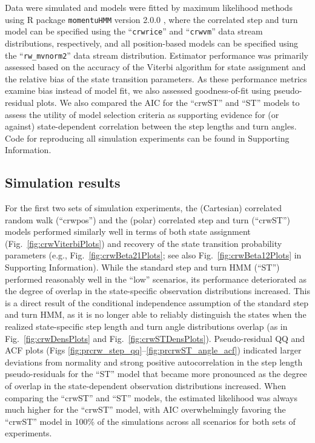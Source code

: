 \documentclass[12pt]{article}\usepackage[]{graphicx}\usepackage[]{xcolor}
\begin{document}
Data were simulated and models were fitted by maximum likelihood methods using R package \verb|momentuHMM| version 2.0.0 \citep{McClintockMichelot2018}, where the correlated step and turn model can be specified using the ``\verb|crwrice|'' and ``\verb|crwvm|'' data stream distributions, respectively, and all position-based models can be specified using the ``\verb|rw_mvnorm2|'' data stream distribution. Estimator performance was primarily assessed based on the accuracy of the Viterbi algorithm for state assignment \citep[e.g.,][]{ZucchiniEtAl2016} and the relative bias of the state transition parameters. As these performance metrics examine bias instead of model fit, we also assessed goodness-of-fit using pseudo-residual plots. We also compared the AIC for the ``crwST'' and ``ST'' models to assess the utility of model selection criteria as supporting evidence for (or against) state-dependent correlation between the step lengths and turn angles. Code for reproducing all simulation experiments can be found in Supporting Information.

\subsection{Simulation results}
For the first two sets of simulation experiments, the (Cartesian) correlated random walk (``crwpos'') and the (polar) correlated step and turn (``crwST'') models performed similarly well in terms of both state assignment (Fig.\ \ref{fig:crwViterbiPlots}) and recovery of the state transition probability parameters (e.g., Fig.\ \ref{fig:crwBeta21Plots}; see also Fig.\ \ref{fig:crwBeta12Plots} in Supporting Information). While the standard step and turn HMM (``ST'') performed reasonably well in the ``low'' scenarios, its performance deteriorated as the degree of overlap in the state-specific observation distributions increased. This is a direct result of the conditional independence assumption of the standard step and turn HMM, as it is no longer able to reliably distinguish the states when the realized state-specific step length and turn angle distributions overlap (as in Fig.\ \ref{fig:crwDensPlots} and Fig.\ \ref{fig:crwSTDensPlots}). Pseudo-residual QQ and ACF plots (Figs \ref{fig:prcrw_step_qq}--\ref{fig:prcrwST_angle_acf}) indicated larger deviations from normality and strong positive autocorrelation in the step length pseudo-residuals for the ``ST'' model that became more pronounced as the degree of overlap in the state-dependent observation distributions increased. When comparing the ``crwST'' and ``ST'' models, the estimated likelihood was always much higher for the ``crwST'' model, with AIC overwhelmingly favoring the ``crwST'' model in 100\% of the simulations across all scenarios for both sets of experiments.
\end{document}

